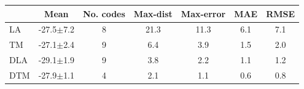 \begin{tabular}{|l c c c c c c|}
\toprule
 & Mean & No. codes & Max-dist & Max-error & MAE & RMSE \\
\midrule
LA & -27.5$\pm$7.2 & 8 & 21.3 & 11.3 & 6.1 & 7.1 \\
TM & -27.1$\pm$2.4 & 9 & 6.4 & 3.9 & 1.5 & 2.0 \\
DLA & -29.1$\pm$1.9 & 9 & 3.8 & 2.2 & 1.1 & 1.2 \\
DTM & -27.9$\pm$1.1 & 4 & 2.1 & 1.1 & 0.6 & 0.8 \\
\bottomrule
\end{tabular}
